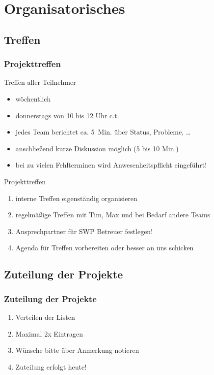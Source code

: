 \documentclass[ucs,9pt]{beamer}
\begin{document}
\section{Organisatorisches}
\subsection{Treffen}
\begin{frame}
  \frametitle{Projekttreffen}
  \begin{block}{Treffen aller Teilnehmer}
    \begin{itemize}
      \item wöchentlich
      \item donnerstags von 10 bis 12 Uhr c.t.
      \item jedes Team berichtet ca. 5~Min. über Status, Probleme, \dots
      \item anschließend kurze Diskussion möglich (5 bis 10 Min.)
      \item bei zu vielen Fehlterminen wird Anwesenheitspflicht eingeführt!
    \end{itemize}
  \end{block}

  \begin{block}{Projekttreffen}
    \begin{enumerate}
      \item interne Treffen eigenständig organisieren
      \item regelmäßige Treffen mit Tim, Max und bei Bedarf andere Teams
      \item Ansprechpartner für SWP Betreuer festlegen!
      \item Agenda für Treffen vorbereiten oder besser an uns schicken
    \end{enumerate}
  \end{block}
\end{frame}

\subsection{Zuteilung der Projekte}
\begin{frame}
  \frametitle{Zuteilung der Projekte}
  \begin{enumerate}
    \item Verteilen der Listen
    \item Maximal 2x Eintragen
    \item Wünsche bitte über Anmerkung notieren
    \item Zuteilung erfolgt heute!
  \end{enumerate}
\end{frame}
\end{document}
